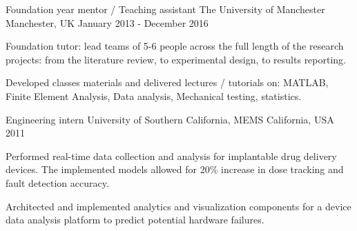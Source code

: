\begin{cventries}

\cventry
{ Foundation year mentor /  Teaching assistant}
{The University of Manchester}
{Manchester, UK}
{January 2013 - December 2016}
{
\begin{cvitems}
\item {Foundation tutor: lead teams of 5-6 people across the full length of the research projects:
from the literature review, to experimental design, to results reporting.}
\item { Developed classes materials and delivered lectures / tutorials on: MATLAB, Finite Element
Analysis, Data analysis, Mechanical testing, statistics.}
\end{cvitems}
}




\cventry
{Engineering intern}
{University of Southern California, MEMS}
{California, USA}
{2011}
{
\begin{cvitems}
\item {Performed real-time data collection and analysis for implantable drug delivery devices. The implemented models allowed for 20\% increase in dose tracking and fault detection accuracy.}
\item {Architected and implemented analytics and visualization components for a device data analysis platform to predict potential hardware failures.}
\end{cvitems}
}


\end{cventries}